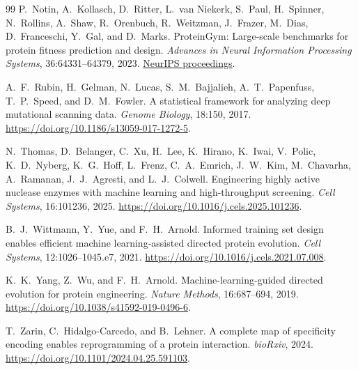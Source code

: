 \begin{thebibliography}{99}
P.~Notin, A.~Kollasch, D.~Ritter, L.~van Niekerk, S.~Paul, H.~Spinner,
N.~Rollins, A.~Shaw, R.~Orenbuch, R.~Weitzman, J.~Frazer, M.~Dias,
D.~Franceschi, Y.~Gal, and D.~Marks.
\newblock ProteinGym: Large-scale benchmarks for protein fitness prediction and design.
\newblock \emph{Advances in Neural Information Processing Systems},
36:64331--64379, 2023.
\newblock \href{https://proceedings.neurips.cc/paper_files/paper/2023/hash/cac723e5ff29f65e3fcbb0739ae91bee-Abstract-Datasets_and_Benchmarks.html}{NeurIPS proceedings}.

A.~F.~Rubin, H.~Gelman, N.~Lucas, S.~M.~Bajjalieh, A.~T.~Papenfuss,
T.~P.~Speed, and D.~M.~Fowler.
\newblock A statistical framework for analyzing deep mutational scanning data.
\newblock \emph{Genome Biology}, 18:150, 2017.
\newblock \url{https://doi.org/10.1186/s13059-017-1272-5}.

N.~Thomas, D.~Belanger, C.~Xu, H.~Lee, K.~Hirano, K.~Iwai, V.~Polic,
K.~D.~Nyberg, K.~G.~Hoff, L.~Frenz, C.~A.~Emrich, J.~W.~Kim,
M.~Chavarha, A.~Ramanan, J.~J.~Agresti, and L.~J.~Colwell.
\newblock Engineering highly active nuclease enzymes with machine learning
and high-throughput screening.
\newblock \emph{Cell Systems}, 16:101236, 2025.
\newblock \url{https://doi.org/10.1016/j.cels.2025.101236}.

B.~J.~Wittmann, Y.~Yue, and F.~H.~Arnold.
\newblock Informed training set design enables efficient machine learning-assisted
directed protein evolution.
\newblock \emph{Cell Systems}, 12:1026--1045.e7, 2021.
\newblock \url{https://doi.org/10.1016/j.cels.2021.07.008}.

K.~K.~Yang, Z.~Wu, and F.~H.~Arnold.
\newblock Machine-learning-guided directed evolution for protein engineering.
\newblock \emph{Nature Methods}, 16:687--694, 2019.
\newblock \url{https://doi.org/10.1038/s41592-019-0496-6}.

T.~Zarin, C.~Hidalgo-Carcedo, and B.~Lehner.
\newblock A complete map of specificity encoding enables reprogramming of a
protein interaction.
\newblock \emph{bioRxiv}, 2024.
\newblock \url{https://doi.org/10.1101/2024.04.25.591103}.

\end{thebibliography}

